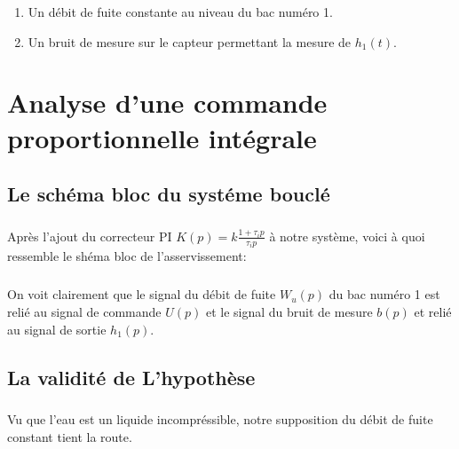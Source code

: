 \documentclass[12pt, a4paper, openany]{report}
\begin{document}
  \begin{enumerate}
      \item Un débit de fuite constante au niveau du bac numéro 1.
      \item Un bruit de mesure sur le capteur permettant la mesure de $h_{1}(t)$.
  \end{enumerate}
   
    
   
   

\chapter{Analyse d'une commande proportionnelle intégrale}

 \section{Le schéma bloc du systéme bouclé} 

\paragraph{}
	Après l'ajout du correcteur PI $K(p)= k \frac {1+\tau_{i}p}{\tau_{i}p}$ à notre système, voici à quoi ressemble le       shéma bloc de l'asservissement:
  \begin{center}
    \label{fig2}
  \end{center}    
 
 \paragraph{}
	On voit clairement que le signal du débit de fuite $W_{u}(p)$ du bac numéro 1 est relié au signal de commande $U(p)$ et le signal du bruit de mesure $b(p)$ et relié au signal de sortie $h_{1}(p)$.    
	
 \section{La validité de L'hypothèse} 
  
 \paragraph{}       
	Vu que l'eau est un liquide incompréssible, notre supposition du débit de fuite constant tient la route.
	
\end{document}
